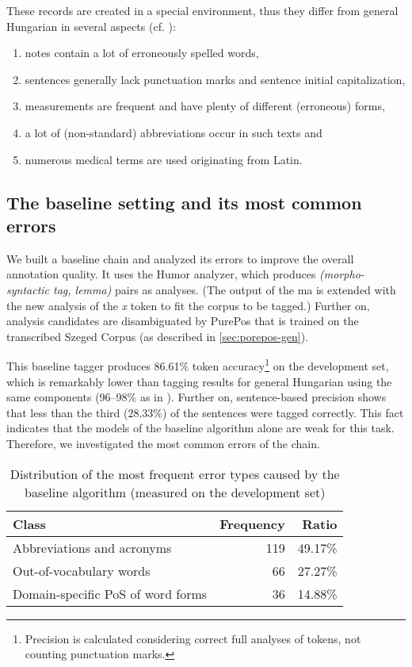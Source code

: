 These records are created in a special environment, thus they differ from general Hungarian in several aspects (cf. \cite{Orosz2013a,Siklosi2013b,Siklosi2012}):

\begin{enumerate} %
 \item notes contain a lot of erroneously spelled words,
 \item sentences generally lack punctuation marks and sentence initial capitalization, 
 \item measurements are frequent and have plenty of different (erroneous) forms,
 \item a lot of (non-standard) abbreviations occur in such texts and
 \item numerous medical terms are used originating from Latin.
\end{enumerate}

\subsection{The baseline setting and its most common errors}
\label{sec:baseline}

We built a baseline chain and analyzed its errors to improve the overall annotation quality.
It uses the Humor analyzer, which produces \emph{(morpho-syntactic tag, lemma)} pairs as analyses. 
(The output of the \acrshort{ma} is extended with the new analysis of the \textit{x} token to fit the corpus to be tagged.)
Further on, analysis candidates are disambiguated by PurePos that is trained on the transcribed Szeged Corpus (as described in \ref{sec:porepos-gen}). 

This baseline tagger produces 86.61\% token accuracy\footnote{Precision is calculated considering correct full analyses of tokens, not counting punctuation marks.} on the development set, which is remarkably lower than tagging results for general Hungarian using the same components (96--98\% as in \cite{Orosz2013b,zsibrata2013magyarlanc}). 
Further on, sentence-based precision shows that less than the third (28.33\%) of the sentences were tagged correctly. 
This fact indicates that the models of the baseline algorithm alone are weak for this task. 
Therefore, we investigated the most common errors of the chain.

\begin{table}[H]
\centering
\caption{Distribution of the most frequent error types caused by the baseline algorithm (measured on the development set)}
\label{tab:error_types}
\begin{tabular}{ l r r } 
\hline
Class & Frequency & Ratio \\
\hline
Abbreviations and acronyms & 119 & 49.17\% \\
Out-of-vocabulary words & 66 & 27.27\% \\
Domain-specific PoS of word forms & 36 & 14.88\% \\
\hline
\end{tabular}
\end{table}

